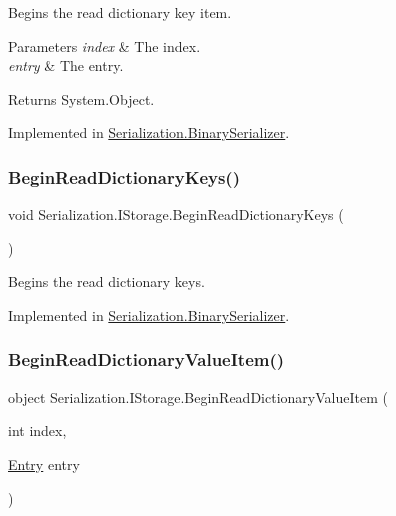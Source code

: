 Begins the read dictionary key item. 


\begin{DoxyParams}{Parameters}
{\em index} & The index.\\
\hline
{\em entry} & The entry.\\
\hline
\end{DoxyParams}
\begin{DoxyReturn}{Returns}
System.\+Object.
\end{DoxyReturn}


Implemented in \hyperlink{class_serialization_1_1_binary_serializer_ae4b30ced98b913465edd4dafb21da8c4}{Serialization.\+Binary\+Serializer}.

\mbox{\label{interface_serialization_1_1_i_storage_ae44889714fb24b498bae004a9e6890ee}} 
\subsubsection{\texorpdfstring{Begin\+Read\+Dictionary\+Keys()}{BeginReadDictionaryKeys()}}
{\footnotesize\ttfamily void Serialization.\+I\+Storage.\+Begin\+Read\+Dictionary\+Keys (\begin{DoxyParamCaption}{ }\end{DoxyParamCaption})}



Begins the read dictionary keys. 



Implemented in \hyperlink{class_serialization_1_1_binary_serializer_aa91a1c6b09260e35b8342d1254e15d3c}{Serialization.\+Binary\+Serializer}.

\mbox{\label{interface_serialization_1_1_i_storage_ab25360e5a7b453f7cbcf2a8d98ea0eb8}} 
\subsubsection{\texorpdfstring{Begin\+Read\+Dictionary\+Value\+Item()}{BeginReadDictionaryValueItem()}}
{\footnotesize\ttfamily object Serialization.\+I\+Storage.\+Begin\+Read\+Dictionary\+Value\+Item (\begin{DoxyParamCaption}\item[{int}]{index,  }\item[{\hyperlink{class_serialization_1_1_entry}{Entry}}]{entry }\end{DoxyParamCaption})}



